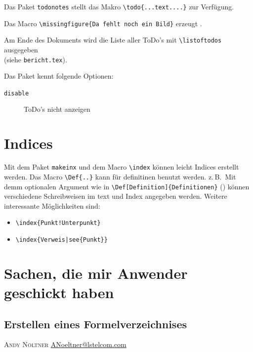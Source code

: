 Das Paket \texttt{todonotes} stellt das Makro
\verb+\todo{...text....}+ zur Verfügung.

Das Macro \verb+\missingfigure{Da fehlt noch ein Bild}+ erzeugt
.


Am Ende des Dokuments wird die Liste aller ToDo's mit \verb+\listoftodos+ ausgegeben\\
(siehe \texttt{bericht.tex}).

\noindent
Das Paket kennt folgende Optionen:
\begin{description}
\item[\texttt{disable}] ToDo's nicht anzeigen
\end{description}


\section{Indices}

Mit dem Paket \verb+makeinx+ und dem Macro \verb+\index+ können  leicht Indices erstellt werden.
Das Macro \verb+\Def{..}+ kann für definitinen benutzt werden.
z.\,B.\, Mit demm optionalen Argument wie in  \verb+\Def[Definition]{Definitionen}+
() können verschiedene Schreibweisen im text und Index angegeben
werden.
Weitere interessante Möglichkeiten sind:
\begin{itemize}
\item \verb+\index{Punkt!Unterpunkt}+ 
\item \verb+\index{Verweis|see{Punkt}}+ 
\end{itemize}


\section{Sachen, die mir Anwender geschickt haben}

\subsection{Erstellen eines Formelverzeichnises}
\textsc{Andy Nöltner} \url{ANoeltner@lstelcom.com}

